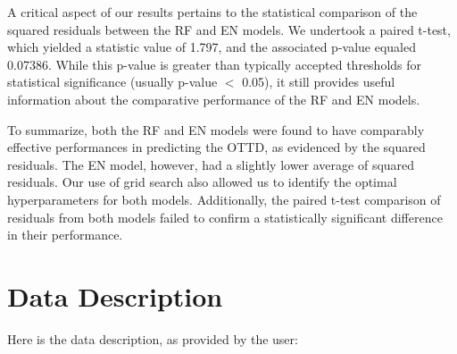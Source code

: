 \documentclass[11pt]{article}
\begin{document}
A critical aspect of our results pertains to the statistical comparison of the squared residuals between the RF and EN models. We undertook a paired t-test, which yielded a statistic value of 1.797, and the associated p-value equaled 0.07386. While this p-value is greater than typically accepted thresholds for statistical significance (usually p-value $<$ 0.05), it still provides useful information about the comparative performance of the RF and EN models.

To summarize, both the RF and EN models were found to have comparably effective performances in predicting the OTTD, as evidenced by the squared residuals. The EN model, however, had a slightly lower average of squared residuals. Our use of grid search also allowed us to identify the optimal hyperparameters for both models. Additionally, the paired t-test comparison of residuals from both models failed to confirm a statistically significant difference in their performance.


\clearpage
\appendix

\section{Data Description} \label{sec:data_description} Here is the data description, as provided by the user:
\end{document}
